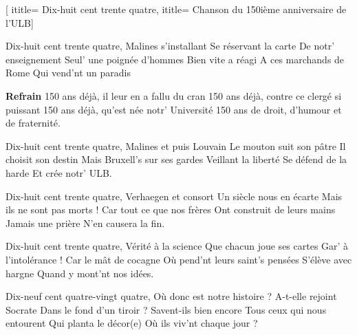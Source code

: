 \beginsong {1834\footnotemark}[
ititle= {Dix-huit cent trente quatre},
ititle= {Chanson du 150ième anniversaire de l'ULB}]


\beginverse
Dix-huit cent trente quatre,
Malines s'installant
Se réservant la carte
De notr' enseignement
Seul' une poignée d'hommes
Bien vite a réagi
A ces marchands de Rome
Qui vend'nt un paradis
\endverse

\beginchorus
\textbf {Refrain}
150 ans déjà, il leur en a fallu du cran
150 ans déjà, contre ce clergé si puissant
150 ans déjà, qu'est née notr' Université
150 ans de droit, d'humour et de fraternité.
\endchorus

\beginverse
Dix-huit cent trente quatre,
Malines et puis Louvain
Le mouton suit son pâtre
Il choisit son destin
Mais Bruxell's sur ses gardes
Veillant la liberté
Se défend de la harde
Et crée notr' ULB.
\endverse

\beginverse
Dix-huit cent trente quatre,
Verhaegen et consort
Un siècle nous en écarte
Mais ils ne sont pas morts !
Car tout ce que nos frères
Ont construit de leurs mains
Jamais une prière
N'en causera la fin.
\endverse

\beginverse
Dix-huit cent trente quatre,
Vérité à la science
Que chacun joue ses cartes
Gar' à l'intolérance !
Car le mât de cocagne
Où pend'nt leurs saint's pensées
S'élève avec hargne
Quand y mont'nt nos idées.
\endverse

\beginverse
Dix-neuf cent quatre-vingt quatre,
Où donc est notre histoire ?
A-t-elle rejoint Socrate
Dans le fond d'un tiroir ?
Savent-ils bien encore
Tous ceux qui nous entourent
Qui planta le décor(e)
Où ils viv'nt chaque jour ?
\endverse

\endsong
